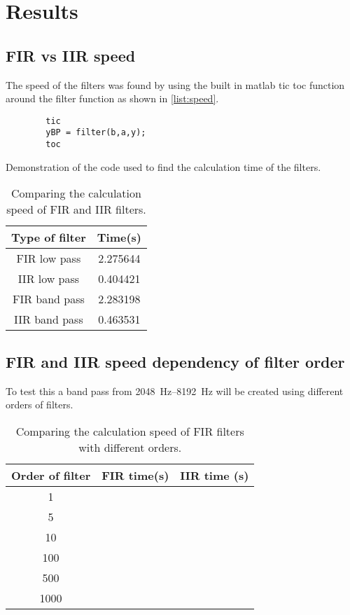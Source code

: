 
\section{Results}

\subsection{FIR vs IIR speed}
The speed of the filters was found by using the built in matlab tic toc function around the filter function as shown in \cref{list:speed}.

\begin{listing}
	\begin{verbatim}
		tic
		yBP = filter(b,a,y);
		toc
	\end{verbatim}
	\caption{Demonstration of the code used to find the calculation time of the filters.}
	\label{list:speed}
\end{listing}

\begin{table}[!htb]
	\centering
	\caption{Comparing the calculation speed of FIR and IIR filters.}
	\label{tab:speed}
	\begin{tabular}{cc}
		Type of filter & Time(\si{\second}) \\
		\midrule
		FIR low pass & \num{2.275644}\\
		IIR low pass & \num{0.404421}\\
		FIR band pass & \num{2.283198}\\
		IIR band pass & \num{0.463531}
	\end{tabular}
\end{table}

\subsection{FIR and IIR speed dependency of filter order}
To test this a band pass from \SIrange{2048}{8192}{\hertz} will be created using different orders of filters.
\begin{table}[!htb]
	\centering
	\caption{Comparing the calculation speed of FIR filters with different orders.}
	\label{tab:FIR_speed}
	\begin{tabular}{ccc}
		Order of filter & FIR time(\si{\second}) & IIR time (\si{\second}) \\
		\midrule
		1 & & \\
		5 & & \\
		10 & & \\
		100 & & \\
		500 & & \\
		1000 & & \\
		
	\end{tabular}
\end{table}
